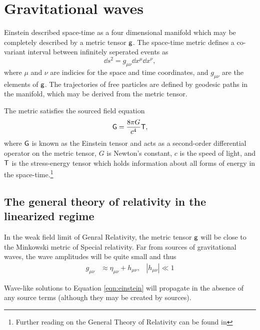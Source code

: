 \chapter{Gravitational waves}


Einstein described space-time as a four dimensional manifold which may be completely described by a metric tensor $\mathsf{g}$. %
The space-time metric defines a co-variant interval between infinitely seperated events as
\begin{equation}
\dd s^2 = g_{\mu \nu}\dd x^\mu \dd x^\nu,
\end{equation}
where $\mu$ and $\nu$ are indicies for the space and time coordinates, and $g_{\mu \nu}$ are the elements of $\mathsf{g}$. %
The trajectories of free particles are defined by geodesic paths in the manifold, which may be derived from the metric tensor.

The metric satisfies the sourced field equation
\begin{equation}
\label{eqn:einstein}
\mathsf{G}=\frac{8\pi G}{c^4}\mathsf{T},
\end{equation}
where $\mathsf{G}$ is known as the Einstein tensor and acts as a second-order differential operator on the metric tensor, $G$ is Newton's constant, $c$ is the speed of light, and $\mathsf{T}$ is the stress-energy tensor which holds information about all forms of energy in the space-time.\footnote{Further reading on the General Theory of Relativity can be found in }

\section{The general theory of relativity in the linearized regime}
In the weak field limit of Genral Relativity, the metric tensor $\mathsf{g}$ will be close to the Minkowski metric of Special relativity. %
Far from sources of gravitational waves, the wave amplitudes will be quite small and thus
\begin{align}
g_{\mu \nu}&\approx \eta_{\mu \nu}+h_{\mu \nu}, &|h_{\mu \nu}|\ll 1
\end{align}

Wave-like solutions to Equation \ref{eqn:einstein} will propagate in the absence of any source terms (although they may be created by sources).


